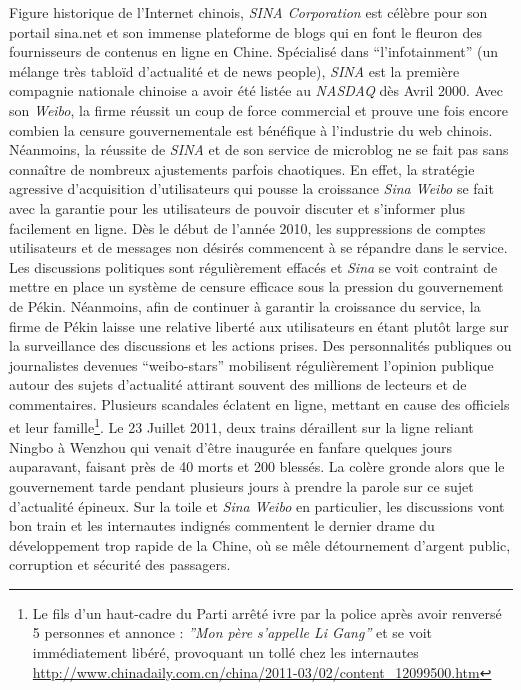 Figure historique de l’Internet chinois, \textit{SINA Corporation} est célèbre pour son portail sina.net et son immense plateforme de blogs qui en font le fleuron des fournisseurs de contenus en ligne en Chine. Spécialisé dans “l’infotainment” (un mélange très tabloïd d’actualité et de news people), \textit{SINA} est la première compagnie nationale chinoise a avoir été listée au \textit{NASDAQ} dès Avril 2000. Avec son \textit{Weibo}, la firme réussit un coup de force commercial et prouve une fois encore combien la censure gouvernementale est bénéfique à l’industrie du web chinois. Néanmoins, la réussite de \textit{SINA} et de son service de microblog ne se fait pas sans connaître de nombreux ajustements parfois chaotiques. En effet, la stratégie agressive d’acquisition d’utilisateurs qui pousse la croissance \textit{Sina Weibo} se fait avec la garantie pour les utilisateurs de pouvoir discuter et s’informer plus facilement en ligne. Dès le début de l’année 2010, les suppressions de comptes utilisateurs et de messages non désirés commencent à se répandre dans le service. Les discussions politiques sont régulièrement effacés et \textit{Sina} se voit contraint de mettre en place un système de censure efficace sous la pression du gouvernement de Pékin. Néanmoins, afin de continuer à garantir la croissance du service, la firme de Pékin laisse une relative liberté aux utilisateurs en étant plutôt large sur la surveillance des discussions et les actions prises. Des personnalités publiques ou journalistes devenues “weibo-stars” mobilisent régulièrement l’opinion publique autour des sujets d’actualité attirant souvent des millions de lecteurs et de commentaires. Plusieurs scandales éclatent en ligne, mettant en cause des officiels et leur famille\footnote{Le fils d’un haut-cadre du Parti arrêté ivre par la police après avoir renversé 5 personnes et annonce : \textit{”Mon père s’appelle Li Gang”} et se voit immédiatement libéré, provoquant un tollé chez les internautes \url{http://www.chinadaily.com.cn/china/2011-03/02/content_12099500.htm}}. Le 23 Juillet 2011, deux trains déraillent sur la ligne reliant Ningbo à Wenzhou qui venait d’être inaugurée en fanfare quelques jours auparavant, faisant près de 40 morts et 200 blessés. La colère gronde alors que le gouvernement tarde pendant plusieurs jours à prendre la parole sur ce sujet d’actualité épineux. Sur la toile et \textit{Sina Weibo} en particulier, les discussions vont bon train et les internautes indignés commentent le dernier drame du développement trop rapide de la Chine, où se mêle détournement d’argent public, corruption et sécurité des passagers. 


